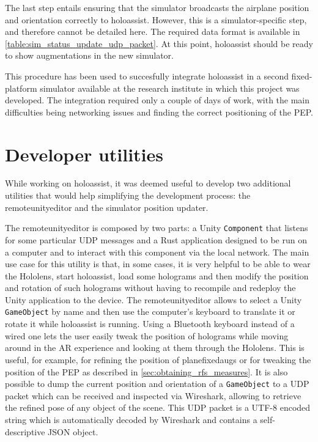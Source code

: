 The last step entails ensuring that the simulator broadcasts the airplane position and orientation correctly to \gls{holoassist}. However, this is a simulator-specific step, and therefore cannot be detailed here. The required data format is available in \autoref{table:sim_status_update_udp_packet}. At this point, \gls{holoassist} should be ready to show augmentations in the new simulator.

This procedure has been used to succesfully integrate \gls{holoassist} in a second fixed-platform simulator available at the research institute in which this project was developed. The integration required only a couple of days of work, with the main difficulties being networking issues and finding the correct positioning of the \gls{PEP}.

\section{Developer utilities}\label{section:developerutilities}

While working on \gls{holoassist}, it was deemed useful to develop two additional utilities that would help simplifying the development process: the \gls{remoteunityeditor} and the simulator position updater.

The \gls{remoteunityeditor} is composed by two parts: a Unity \texttt{Component} that listens for some particular \gls{UDP} messages and a Rust application designed to be run on a computer and to interact with this component via the local network. The main use case for this utility is that, in some cases, it is very helpful to be able to wear the Hololens, start \gls{holoassist}, load some holograms and then modify the position and rotation of such holograms without having to recompile and redeploy the Unity application to the device. The \gls{remoteunityeditor} allows to select a Unity \texttt{GameObject} by name and then use the computer's keyboard to translate it or rotate it while \gls{holoassist} is running. Using a Bluetooth keyboard instead of a wired one lets the user easily tweak the position of holograms while moving around in the \gls{AR} experience and looking at them through the Hololens. This is useful, for example, for refining the position of \glspl{planefixedaug} or for tweaking the position of the \gls{PEP} as described in \autoref{sec:obtaining_rfs_measures}. It is also possible to dump the current position and orientation of a \texttt{GameObject} to a \gls{UDP} packet which can be received and inspected via Wireshark, allowing to retrieve the refined pose of any object of the scene. This \gls{UDP} packet is a UTF-8 encoded string which is automatically decoded by Wireshark and contains a self-descriptive JSON object.

